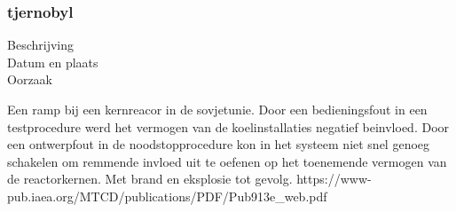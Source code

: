 \cite{zuilen23022019Tijdlijnpoldercrash}
\cite{wikinews04032009techfoutailines1951}
\cite{luchtvaartnieuws21012020boeing737conclusies}
\cite{adformatie280220209communicatiegebreken}
\cite{spinnael25022009onderzoekpolderbaancrash}
\cite{crashTurkishAirlines}
\cite{flightradar24}
\cite{flightstatstracker}
 

\subsubsection{tjernobyl}

	\begin{description}
	\item[Beschrijving]
	\item[Datum en plaats] 
	\item[Oorzaak]
\end{description}
Een ramp bij een kernreacor in de sovjetunie. Door een bedieningsfout in een testprocedure werd het vermogen van de koelinstallaties negatief beinvloed. Door een ontwerpfout in de noodstopprocedure kon in het systeem niet snel genoeg schakelen om remmende invloed uit te oefenen op het toenemende vermogen van de reactorkernen. Met brand en eksplosie tot gevolg.
https://www-pub.iaea.org/MTCD/publications/PDF/Pub913e_web.pdf 
\cite{INSAVienna1992Chernobyl}

